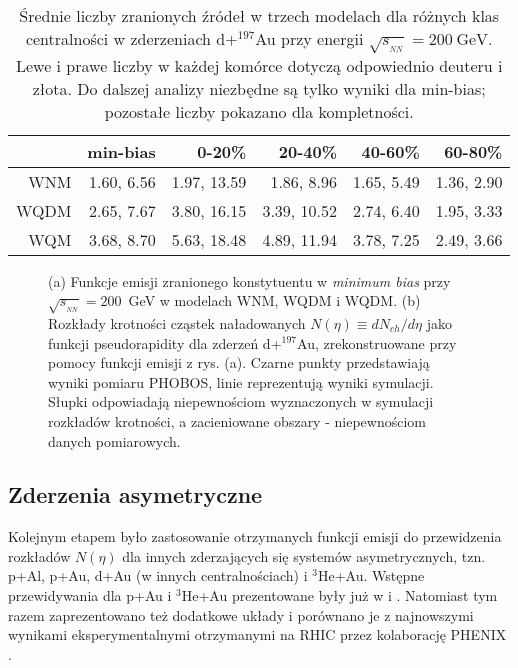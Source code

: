 \documentclass[a4paper,12pt]{article}
\begin{document}
\begin{table}[H]\centering
\begin{tabular}{|r|r|r|r|r|r|} \hline
 & min-bias & 0-20\% & 20-40\% & 40-60\% & 60-80\% \\ \hline
WNM  & 1.60, 6.56 & 1.97, 13.59 & 1.86,  8.96 & 1.65, 5.49 & 1.36, 2.90 \\ \hline
WQDM & 2.65, 7.67 & 3.80, 16.15 & 3.39, 10.52 & 2.74, 6.40 & 1.95, 3.33 \\ \hline
WQM  & 3.68, 8.70 & 5.63, 18.48 & 4.89, 11.94 & 3.78, 7.25 & 2.49, 3.66 \\ \hline
\end{tabular}
\caption{Średnie liczby zranionych źródeł w trzech modelach dla różnych klas centralności w zderzeniach d+$^{197}$Au przy energii $\sqrt{s_{_{NN}}} = 200~\text{GeV}$. Lewe i prawe liczby w każdej komórce dotyczą odpowiednio deuteru i złota. Do dalszej analizy niezbędne są tylko wyniki dla min-bias; pozostałe liczby pokazano dla kompletności.}\label{table:d-Au0}
\end{table}
\begin{figure}[h!]
\begin{center}
%
\hspace{0.3cm}
%
\caption{(a) Funkcje emisji zranionego konstytuentu w \textit{minimum bias} przy $\sqrt{s_{_{NN}}}=200$~GeV w modelach WNM, WQDM i WQDM. (b) Rozkłady krotności cząstek naładowanych $N(\eta)\equiv dN_{ch}/d\eta$ jako funkcji pseudorapidity dla zderzeń d+$^{197}$Au, zrekonstruowane przy pomocy funkcji emisji z rys. (a). Czarne punkty przedstawiają wyniki pomiaru PHOBOS, linie reprezentują wyniki symulacji. Słupki odpowiadają niepewnościom wyznaczonych w symulacji rozkładów krotności, a zacieniowane obszary - niepewnościom danych pomiarowych.}\label{fig:F0}
\end{center}
\end{figure}

\subsection{Zderzenia asymetryczne}
Kolejnym etapem było zastosowanie otrzymanych funkcji emisji do przewidzenia rozkładów $N(\eta)$ dla innych zderzających się systemów asymetrycznych, tzn. p+Al, p+Au, d+Au (w innych centralnościach) i $^3$He+Au. Wstępne przewidywania dla p+Au i $^3$He+Au prezentowane były już w \cite{Barej:pracaInz18} i \cite{Barej:2017kcw}. Natomiast tym razem zaprezentowano też dodatkowe układy i porównano je z najnowszymi wynikami eksperymentalnymi otrzymanymi na RHIC przez kolaborację PHENIX \cite{Adare:2018toe}.
\end{document}
